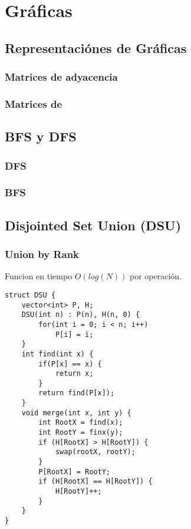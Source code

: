 \documentclass[11pt]{article}
\begin{document}
\section{Gráficas}
\label{sec:orgbe5c12b}
\subsection{Representaciónes de Gráficas}
\label{sec:org81d6ea2}
\subsubsection{Matrices de adyacencia}
\label{sec:orgced0394}

\subsubsection{Matrices de}
\label{sec:org0e96fce}

\subsection{BFS y DFS}
\label{sec:org964fd18}
\subsubsection{DFS}
\label{sec:org64fa341}

\subsubsection{BFS}
\label{sec:org842a5ee}
\subsection{Disjointed Set Union (DSU)}
\label{sec:org0184f43}
\subsubsection{Union by Rank}
\label{sec:org21a521b}

Funcion en tiempo \(O(log(N))\) por operación.

\lstset{language=C++,label= ,caption= ,captionpos=b,numbers=none}
\begin{lstlisting}
struct DSU {
	vector<int> P, H;
	DSU(int n) : P(n), H(n, 0) {
		for(int i = 0; i < n; i++)
			P[i] = i;
	}
	int find(int x) {
		if(P[x] == x) {
			return x;
		}
		return find(P[x]);
	}
	void merge(int x, int y) {
		int RootX = find(x);
		int RootY = finx(y);
		if (H[RootX] > H[RootY]) {
			swap(rootX, rootY);
		}
		P[RootX] = RootY;
		if (H[RootX] == H[RootY]) {
			H[RootY]++;
		}
	}
}
\end{lstlisting}
\end{document}
